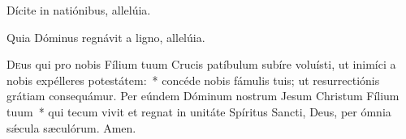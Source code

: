 \vv Dícite in natiónibus, allelúia.

\rr Quia Dóminus regnávit a ligno, allelúia.


\lettrine{D}{e}us qui pro nobis Fílium tuum Crucis patíbulum subíre voluísti, ut inimíci a nobis expélleres potestátem:~* concéde nobis fámulis tuis; ut resurrectiónis grátiam consequámur. Per eúndem Dóminum nostrum Jesum Christum Fílium tuum~* qui tecum vivit et regnat in unitáte Spíritus Sancti, Deus, per ómnia sǽcula sæculórum. \rr Amen.